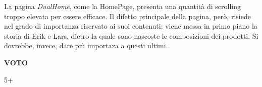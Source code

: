 La pagina \textit{DualHome}, come la HomePage, presenta una quantità di scrolling troppo elevata per essere efficace. Il difetto principale della pagina, però, risiede nel grado di importanza riservato ai suoi contenuti: viene messa in primo piano la storia di Erik e Lars, dietro la quale sono nascoste le composizioni dei prodotti. Si dovrebbe, invece, dare più importaza a questi ultimi.
\begin{center}
    \begin{Large}
    \textbf{VOTO}\\
    \vspace{0.1cm}
    \end{Large}
    \begin{huge}
    5+
    \end{huge}
\end{center}